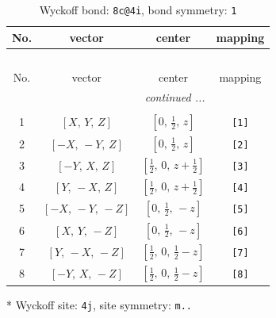 \documentclass[fleqn,8pt]{jsarticle}
\begin{document}
\renewcommand{\arraystretch}{1.2}
\begin{longtable}{cccc}
\caption{Wyckoff bond: {\tt 8c@4i}, bond symmetry: {\tt 1}}
 \\
 \hline \hline
No. & vector & center & mapping \\ \hline \endfirsthead

\multicolumn{3}{l}{\tablename\ \thetable{}} \\
 \hline \hline
No. & vector & center & mapping \\ \hline \endhead

 \hline \hline
\multicolumn{3}{r}{\footnotesize\it continued ...} \\ \endfoot

 \hline \hline
\multicolumn{3}{r}{} \\ \endlastfoot

1 & $\left[ X,\, Y,\, Z \right]$ & $\left[ 0,\, \frac{1}{2},\, z \right]$ & {\tt [1]} \\ \hline
2 & $\left[ - X,\, - Y,\, Z \right]$ & $\left[ 0,\, \frac{1}{2},\, z \right]$ & {\tt [2]} \\ \hline
3 & $\left[ - Y,\, X,\, Z \right]$ & $\left[ \frac{1}{2},\, 0,\, z + \frac{1}{2} \right]$ & {\tt [3]} \\ \hline
4 & $\left[ Y,\, - X,\, Z \right]$ & $\left[ \frac{1}{2},\, 0,\, z + \frac{1}{2} \right]$ & {\tt [4]} \\ \hline
5 & $\left[ - X,\, - Y,\, - Z \right]$ & $\left[ 0,\, \frac{1}{2},\, - z \right]$ & {\tt [5]} \\ \hline
6 & $\left[ X,\, Y,\, - Z \right]$ & $\left[ 0,\, \frac{1}{2},\, - z \right]$ & {\tt [6]} \\ \hline
7 & $\left[ Y,\, - X,\, - Z \right]$ & $\left[ \frac{1}{2},\, 0,\, \frac{1}{2} - z \right]$ & {\tt [7]} \\ \hline
8 & $\left[ - Y,\, X,\, - Z \right]$ & $\left[ \frac{1}{2},\, 0,\, \frac{1}{2} - z \right]$ & {\tt [8]} \\
\end{longtable}
* Wyckoff site: {\tt 4j}, site symmetry: {\tt m..}
\renewcommand{\arraystretch}{1.2}
\end{document}
